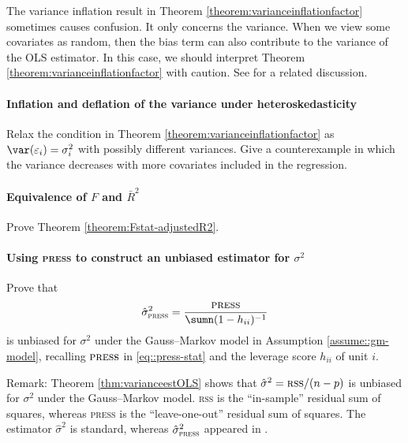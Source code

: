 The variance inflation result in Theorem \ref{theorem:varianceinflationfactor} sometimes causes confusion. It only concerns the variance. When we view some covariates as random, then the bias term can also contribute to the variance of the OLS estimator. In this case, we should interpret Theorem \ref{theorem:varianceinflationfactor} with caution. See \citet{ding2019two} for a related discussion. 


 


\paragraph{Inflation and deflation of the variance under heteroskedasticity}\label{hw12::inf-def-heteroskedasticity}

Relax the condition in Theorem \ref{theorem:varianceinflationfactor}  as $\var(\varepsilon_i) = \sigma_i^2$ with possibly different variances.  Give a counterexample in which the variance decreases with more covariates included in the regression. 



\paragraph{Equivalence of $F$ and $\bar{R}^{2}$}\label{hw12::f-r2}

Prove Theorem \ref{theorem:Fstat-adjustedR2}. 


\paragraph{Using \textsc{press} to construct an unbiased estimator for $\sigma^2$}\label{hw12::press-unbiased-sigma2}


Prove that 
$$
\hat{\sigma}^{2}_{\textsc{press}} 
= 
\frac{  \textsc{press}  }{ \sumn (1-h_{ii})^{-1}   }
$$
is unbiased for $\sigma^2$ under the Gauss--Markov model in Assumption \ref{assume::gm-model}, recalling $\textsc{press} $ in \eqref{eq::press-stat} and the leverage score $h_{ii}$ of unit $i$. 


Remark: Theorem \ref{thm:varianceestOLS} shows that $\hat{\sigma}^{2}=\textsc{rss}/(n-p)$ is unbiased for $\sigma^2$ under the Gauss--Markov model. 
\textsc{rss} is the ``in-sample'' residual sum of squares, whereas \textsc{press} is the ``leave-one-out'' residual sum of squares. 
The estimator $\hat{\sigma}^{2}$ is standard, whereas $\hat{\sigma}^{2}_{\textsc{press}} $ appeared in \citet{shen2023algebraic}. 




